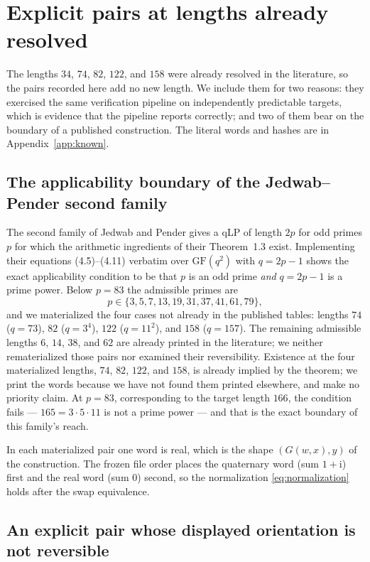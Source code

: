 \documentclass[11pt]{article}
\newcommand{\ii}{\mathrm{i}}
\begin{document}
\section{Explicit pairs at lengths already resolved}
\label{sec:known}

The lengths $34$, $74$, $82$, $122$, and $158$ were already resolved in the
literature, so the pairs recorded here add no new length.  We include them for
two reasons: they exercised the same verification pipeline on independently
predictable targets, which is evidence that the pipeline reports correctly;
and two of them bear on the boundary of a published construction.  The literal
words and hashes are in Appendix~\ref{app:known}.

\subsection*{The applicability boundary of the Jedwab--Pender second family}

The second family of Jedwab and Pender \cite{jedwab-pender-2025} gives a qLP
of length $2p$ for odd primes $p$ for which the arithmetic ingredients of
their Theorem~1.3 exist.  Implementing their equations (4.5)--(4.11) verbatim
over $\mathrm{GF}(q^2)$ with $q=2p-1$ shows the exact applicability condition
to be that $p$ is an odd prime \emph{and} $q=2p-1$ is a prime power.  Below
$p=83$ the admissible primes are
\[
  p\in\{3,5,7,13,19,31,37,41,61,79\},
\]
and we materialized the four cases not already in the published tables:
lengths $74$ ($q=73$), $82$ ($q=3^4$), $122$ ($q=11^2$), and $158$
($q=157$).  The remaining admissible lengths $6$, $14$, $38$, and $62$ are
already printed in the literature; we neither rematerialized those pairs nor
examined their reversibility.  Existence at the four materialized lengths,
$74$, $82$, $122$, and $158$, is already implied by the theorem;
we print the words because we have not found them printed elsewhere, and make
no priority claim.  At $p=83$, corresponding to the
target length $166$, the condition fails --- $165=3\cdot5\cdot11$ is
not a prime power --- and that is the exact boundary of this family's reach.

In each materialized pair one word is real, which is the shape $(G(w,x),y)$ of
the construction.  The frozen file order places the quaternary word (sum
$1+\ii$) first and the real word (sum $0$) second, so the normalization
\eqref{eq:normalization} holds after the swap equivalence.

\subsection*{An explicit pair whose displayed orientation is not reversible}
\end{document}
